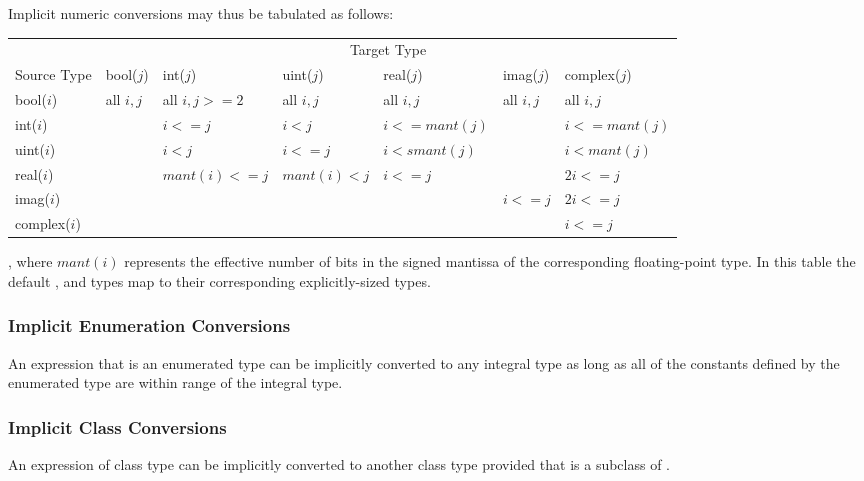 Implicit numeric conversions may thus be tabulated as follows:
\begin{center}
\begin{tabular}{l|llllll|}
\cline{2-7}
& \multicolumn{6}{c|}{Target Type} \\
Source Type & bool($j$) & int($j$) & uint($j$) & real($j$) & imag($j$) & complex($j$) \\ \cline{2-7}
bool($i$) & all $i,j$ & all $i,j>=2$ & all $i,j$ & all $i,j$ & all $i,j$ & all $i,j$ \\
int($i$) & & $i<=j$ & $i<j$ & $i<=mant(j)$ & & $i<=mant(j)$ \\
uint($i$) & & $i<j$ & $i<=j$ & $i<smant(j)$ & & $i<mant(j)$ \\
real($i$) & & $mant(i)<=j$ & $mant(i)<j$ & $i<=j$ & & $2i<=j$ \\
imag($i$) & & & & & $i<=j$ & $2i<=j$ \\
complex($i$) & & & & & & $i<=j$ \\ \cline{2-7}
\end{tabular}
\end{center}
, where $mant(i)$ represents the effective number of bits in the signed mantissa
of the corresponding floating-point type.  In this table the
default ,  and  types map to their corresponding
explicitly-sized types.

\subsubsection{Implicit Enumeration Conversions}
\label{Implicit_Enumeration_Conversions}

An expression that is an enumerated type can be implicitly converted
to any integral type as long as all of the constants defined by the
enumerated type are within range of the integral type.


\subsubsection{Implicit Class Conversions}
\label{Implicit_Class_Conversions}

An expression of class type  can be implicitly converted to
another class type  provided that  is a subclass
of .

